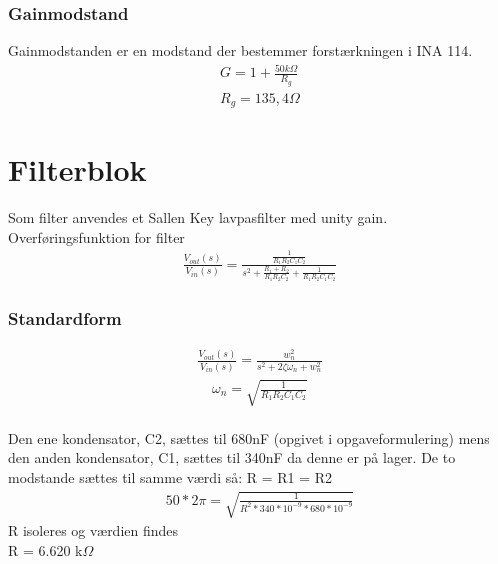 \subsubsection{Gainmodstand}
Gainmodstanden er en modstand der bestemmer forstærkningen i INA 114.\\
\begin{align}
	G = 1+\frac{50k\Omega}{R_g}\\
	R_g = 135,4 \Omega
\end{align}

\section{Filterblok}
Som filter anvendes et Sallen Key lavpasfilter med unity gain.\\
Overføringsfunktion for filter\\
\begin{align}
	\frac{V_{out}(s)}{V_{in}(s)}=\frac{\frac{1}{R_1R_2C_1C_2}}{s^2+\frac{R_1+R_2}{R_1R_2C_2}+\frac{1}{R_1R_2C_1C_2}}
\end{align}
\subsubsection{Standardform}
\begin{align}
	\frac{V_{out}(s)}{V_{in}(s)}=\frac{w_n^2}{s^2+2\zeta\omega _n+w_n^2}
\end{align}
\begin{align}
	\omega _n = \sqrt{\frac{1}{R_1R_2C_1C_2}}
\end{align}
\\
Den ene kondensator, C2, sættes til 680nF (opgivet i opgaveformulering) mens den anden kondensator, C1, sættes til 340nF da denne er på lager. De to modstande sættes til samme værdi så: R = R1 = R2 
\begin{align}
	50*2\pi = \sqrt{\frac{1}{R^2*340*10^{-9}*680*10^{-9}}}
\end{align}
R isoleres og værdien findes\\ R = 6.620 k$\Omega$


